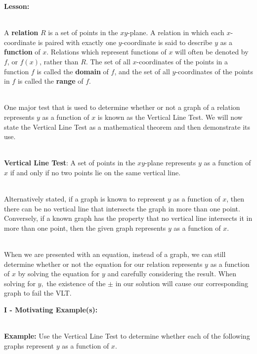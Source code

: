 \documentclass[12pt]{article}
\theoremstyle{definition}
\begin{document}
{\bf Lesson:}\\
\ \par
A {\bf relation} $R$ is a set of points in the $xy$-plane.  A relation in which each $x$-coordinate is paired with exactly one $y$-coordinate is said to describe $y$ as a {\bf function} of $x$.  Relations which represent functions of $x$ will often be denoted by $f$, or $f(x)$, rather than $R$.  The set of all $x$-coordinates of the points in a function $f$ is called the {\bf domain} of $f$, and the set of all $y$-coordinates of the points in $f$ is called the {\bf range} of $f$.\\
\ \par
One major test that is used to determine whether or not a graph of a relation represents $y$ as a function of $x$ is known as the Vertical Line Test.  We will now state the Vertical Line Test as a mathematical theorem and then demonstrate its use.\\
\ \par
{\bf Vertical Line Test}: A set of points in the $xy$-plane represents $y$ as a function of $x$ if and only if no two points lie on the same vertical line.\\
\ \par
Alternatively stated, if a graph is known to represent $y$ as a function of $x$, then there can be no vertical line that intersects the graph in more than one point.  Conversely, if a known graph has the property that no vertical line intersects it in more than one point, then the given graph represents $y$ as a function of $x$.\\
\ \par
When we are presented with an equation, instead of a graph, we can still determine whether or not the equation for our relation represents $y$ as a function of $x$ by solving the equation for $y$ and carefully considering the result.  When solving for $y,$ the existence of the $\pm$ in our solution will cause our corresponding graph to fail the VLT.

\newpage

{\bf I - Motivating Example(s):}\\
\ \par
{\bf Example:} Use the Vertical Line Test to determine whether each of the following graphs represent $y$ as a function of $x$.
\end{document}

